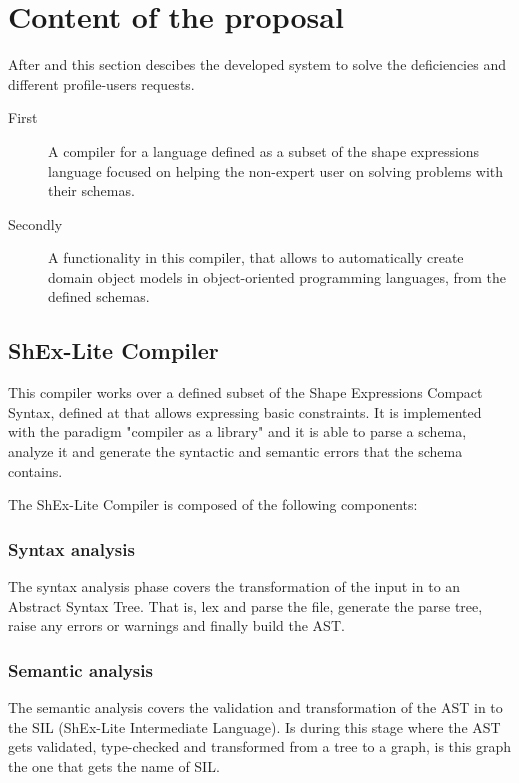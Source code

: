 \section{Content of the proposal}

After  and  this section descibes the developed system to solve the deficiencies and different profile-users requests.

\begin{description}
  \item[First] A compiler for a language defined as a subset of the shape expressions language focused on helping the non-expert user on solving problems with their schemas.
  \item[Secondly] A functionality in this compiler, that allows to automatically create domain object models in object-oriented programming languages, from the defined schemas.
\end{description}

\subsection{ShEx-Lite Compiler}
This compiler works over a defined subset of the Shape Expressions Compact Syntax, defined at  that allows expressing basic constraints. It is implemented with the paradigm "compiler as a library" and it is able to parse a schema, analyze it and generate the syntactic and semantic errors that the schema contains.

The ShEx-Lite Compiler is composed of the following components:

\subsubsection{Syntax analysis}
The syntax analysis phase covers the transformation of the input in to an Abstract Syntax Tree. That is, lex and parse the file, generate the parse tree, raise any errors or warnings and finally build the AST.

\subsubsection{Semantic analysis}
The semantic analysis covers the validation and transformation of the AST in to the SIL (ShEx-Lite Intermediate Language). Is during this stage where the AST gets validated, type-checked and transformed from a tree to a graph, is this graph the one that gets the name of SIL.




